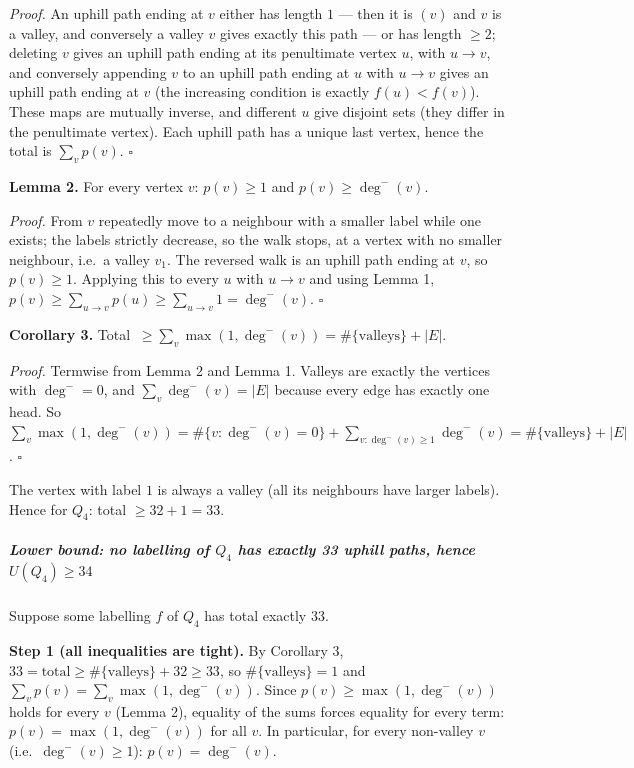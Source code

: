 \documentclass[11pt,a4paper]{article}
\begin{document}
\emph{Proof.} An uphill path ending at \(v\) either has length \(1\) ---
then it is \((v)\) and \(v\) is a valley, and conversely a valley \(v\)
gives exactly this path --- or has length \(\ge2\); deleting \(v\) gives
an uphill path ending at its penultimate vertex \(u\), with \(u\to v\),
and conversely appending \(v\) to an uphill path ending at \(u\) with
\(u\to v\) gives an uphill path ending at \(v\) (the increasing
condition is exactly \(f(u)<f(v)\)). These maps are mutually inverse,
and different \(u\) give disjoint sets (they differ in the penultimate
vertex). Each uphill path has a unique last vertex, hence the total is
\(\sum_v p(v)\). \(\square\)

\textbf{Lemma 2.} For every vertex \(v\): \(p(v)\ge1\) and
\(p(v)\ge\deg^-(v)\).

\emph{Proof.} From \(v\) repeatedly move to a neighbour with a smaller
label while one exists; the labels strictly decrease, so the walk stops,
at a vertex with no smaller neighbour, i.e.~a valley \(v_1\). The
reversed walk is an uphill path ending at \(v\), so \(p(v)\ge1\).
Applying this to every \(u\) with \(u\to v\) and using Lemma 1,
\(p(v)\ge\sum_{u\to v}p(u)\ge\sum_{u\to v}1=\deg^-(v)\). \(\square\)

\textbf{Corollary 3.} Total
\(\ \ge\sum_v\max(1,\deg^-(v))=\#\{\text{valleys}\}+|E|\).

\emph{Proof.} Termwise from Lemma 2 and Lemma 1. Valleys are exactly the
vertices with \(\deg^-=0\), and \(\sum_v\deg^-(v)=|E|\) because every
edge has exactly one head. So
\(\sum_v\max(1,\deg^-(v))=\#\{v:\deg^-(v)=0\}+\sum_{v:\deg^-(v)\ge1}\deg^-(v)=\#\{\text{valleys}\}+|E|\).
\(\square\)

The vertex with label \(1\) is always a valley (all its neighbours have
larger labels). Hence for \(Q_4\): total \(\ge 32+1=33\).

\subparagraph{\texorpdfstring{Lower bound: no labelling of \(Q_4\) has
exactly 33 uphill paths, hence
\(U(Q_4)\ge34\)}{Lower bound: no labelling of Q\_4 has exactly 33 uphill paths, hence U(Q\_4)\textbackslash ge34}}\label{lower-bound-no-labelling-of-q_4-has-exactly-33-uphill-paths-hence-uq_4ge34}

Suppose some labelling \(f\) of \(Q_4\) has total exactly \(33\).

\textbf{Step 1 (all inequalities are tight).} By Corollary 3,
\(33=\text{total}\ge\#\{\text{valleys}\}+32\ge 33\), so
\(\#\{\text{valleys}\}=1\) and \(\sum_v p(v)=\sum_v\max(1,\deg^-(v))\).
Since \(p(v)\ge\max(1,\deg^-(v))\) holds for every \(v\) (Lemma 2),
equality of the sums forces equality for every term:
\(p(v)=\max(1,\deg^-(v))\) for all \(v\). In particular, for every
non-valley \(v\) (i.e.~\(\deg^-(v)\ge1\)): \(p(v)=\deg^-(v)\).
\end{document}
